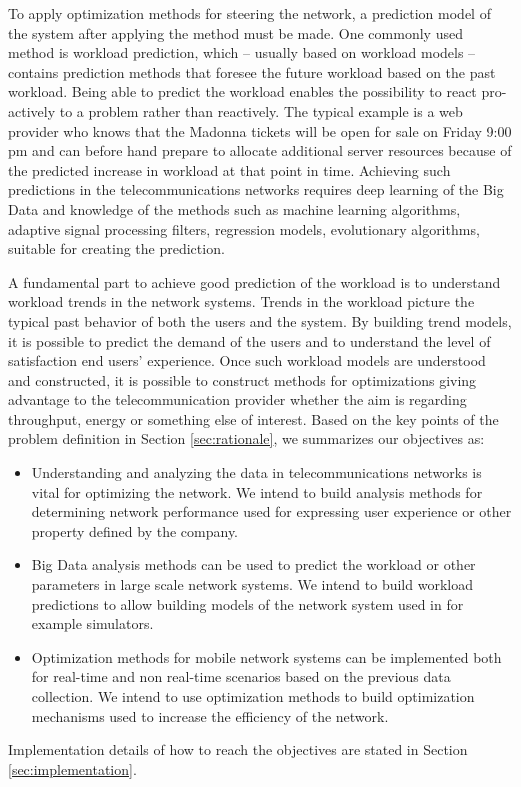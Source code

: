 \documentclass{article}
\begin{document}
To apply optimization methods for steering the network, a prediction model of the system after applying the method must be made.
One commonly used method is workload prediction, which -- usually based on workload models -- contains prediction methods that foresee the future workload based on the past workload.
Being able to predict the workload enables the possibility to react pro-actively to a problem rather than reactively.
The typical example is a web provider who knows that the Madonna tickets will be open for sale on Friday 9:00 pm and can before hand prepare to allocate additional server resources because of the predicted increase in workload at that point in time.
Achieving such predictions in the telecommunications networks requires deep learning of the Big Data and knowledge of the methods such as machine learning algorithms, adaptive signal processing filters, regression models, evolutionary algorithms, suitable for creating the prediction.\vspace{0.2cm}

A fundamental part to achieve good prediction of the workload is to understand workload trends in the network systems.
Trends in the workload picture the typical past behavior of both the users and the system.
By building trend models, it is possible to predict the demand of the users and to understand the level of satisfaction end users' experience.\vspace{0.2cm}
Once such workload models are understood and constructed, it is possible to construct methods for optimizations giving advantage to the telecommunication provider whether the aim is regarding throughput, energy or something else of interest.
Based on the key points of the problem definition in Section \ref{sec:rationale}, we summarizes our objectives as:
\begin{itemize}
 \item Understanding and analyzing the data in telecommunications networks is vital for optimizing the network. We intend to build analysis methods for determining network performance used for expressing user experience or other property defined by the company.\vspace{-0.2cm}
 \item Big Data analysis methods can be used to predict the workload or other parameters in large scale network systems. We intend to build workload predictions to allow building models of the network system used in for example simulators.\vspace{-0.2cm}
 \item Optimization methods for mobile network systems can be implemented both for real-time and non real-time scenarios based on the previous data collection. We intend to use optimization methods to build optimization mechanisms used to increase the efficiency of the network.
\end{itemize}
Implementation details of how to reach the objectives are stated in Section \ref{sec:implementation}.
\end{document}

